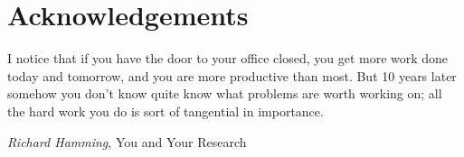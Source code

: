\chapter*{Acknowledgements}


\epigraph{
	I notice that if you have the door to your office closed, you get more work done today and tomorrow, and you are more productive than most. But 10 years later somehow you don't know quite know what problems are worth working on; all the hard work you do is sort of tangential in importance.
}{\textit{Richard Hamming}, You and Your Research}
